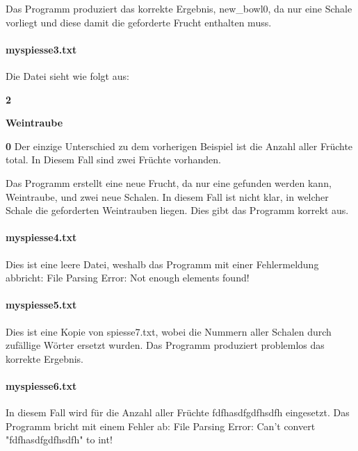 \documentclass[a4paper,10pt,ngerman]{scrartcl}
\begin{document}
Das Programm produziert das korrekte Ergebnis, new\_bowl0, da nur eine Schale vorliegt und diese damit die geforderte Frucht enthalten muss.

\paragraph{myspiesse3.txt}
Die Datei sieht wie folgt aus:

\textbf{2}

\textbf{Weintraube}

\textbf{0}
Der einzige Unterschied zu dem vorherigen Beispiel ist die Anzahl aller Früchte total.
In Diesem Fall sind zwei Früchte vorhanden.

Das Programm erstellt eine neue Frucht, da nur eine gefunden werden kann, Weintraube, und zwei neue Schalen.
In diesem Fall ist nicht klar, in welcher Schale die geforderten Weintrauben liegen.
Dies gibt das Programm korrekt aus.

\paragraph{myspiesse4.txt}
Dies ist eine leere Datei, weshalb das Programm mit einer Fehlermeldung abbricht: \glqq File Parsing Error: Not enough elements found!\grqq{}

\paragraph{myspiesse5.txt}
Dies ist eine Kopie von spiesse7.txt, wobei die Nummern aller Schalen durch zufällige Wörter ersetzt wurden.
Das Programm produziert problemlos das korrekte Ergebnis.

\paragraph{myspiesse6.txt}
In diesem Fall wird für die Anzahl aller Früchte \glqq fdfhasdfgdfhsdfh\grqq{} eingesetzt.
Das Programm bricht mit einem Fehler ab: \glqq File Parsing Error: Can't convert "fdfhasdfgdfhsdfh" to int!\grqq{}
\end{document}
